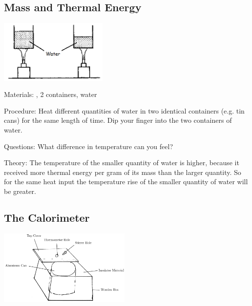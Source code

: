 \begin{multicols}{2}
\subsection{Mass and Thermal Energy}

\begin{center}
\includegraphics[width=0.4\textwidth]{./img/source/thermal-energy.png}
\end{center}

\begin{description*}
\item[Materials:]{, 2 containers, water}
\item[Procedure:]{Heat different quantities of water in two identical containers (e.g. tin cans) for the same length of time. Dip your finger into the two containers of water.}
\item[Questions:]{What difference in temperature can you feel?}
\item[Theory:]{The temperature of the smaller quantity of water is higher, because it received more thermal energy per gram of its mass than the larger quantity. So for the same heat input the temperature rise of the smaller quantity of water will be greater.}
\end{description*}

\subsection{The Calorimeter}

\begin{center}
\includegraphics[width=0.49\textwidth]{./img/calorimeter.png}
\end{center}


\end{multicols}
